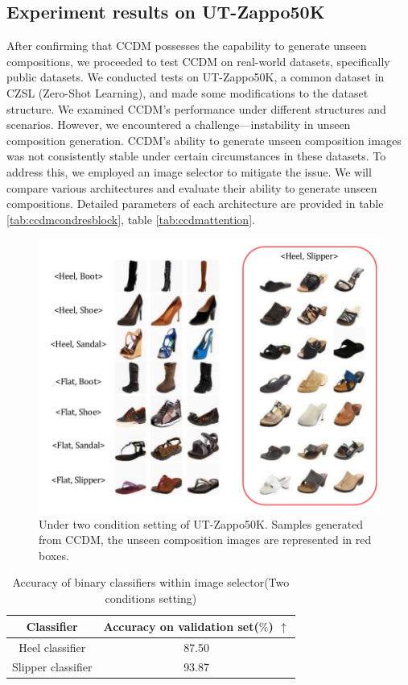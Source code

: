 \subsection{Experiment results on UT-Zappo50K}
After confirming that CCDM possesses the capability to generate unseen compositions, we proceeded to test CCDM on real-world datasets, specifically public datasets. We conducted tests on UT-Zappo50K, a common dataset in CZSL (Zero-Shot Learning), and made some modifications to the dataset structure. We examined CCDM's performance under different structures and scenarios. However, we encountered a challenge—instability in unseen composition generation. CCDM's ability to generate unseen composition images was not consistently stable under certain circumstances in these datasets. To address this, we employed an image selector to mitigate the issue. We will compare various architectures and evaluate their ability to generate unseen compositions. Detailed parameters of each architecture are provided in table \ref{tab:ccdmcondresblock}, table \ref{tab:ccdmattention}.

\begin{figure} [H]
    \centering
    \includegraphics[width=1\linewidth]{figures/Zappo1.pdf}
    \caption{Under two condition setting of UT-Zappo50K. Samples generated from CCDM, the unseen composition images are represented in red boxes.}
    \label{fig:sample_6}
\end{figure}

\begin{table} [H]
    \centering
    \begin{tabular}{cc}
         Classifier & Accuracy on validation set($\%$) $\uparrow$ \\
         \hline
         Heel classifier & 87.50 \\
         Slipper classifier & 93.87 \\
         
    \end{tabular}
    \caption{Accuracy of binary classifiers within image selector(Two conditions setting)}
    \label{ZappoBinAcc}
\end{table}


